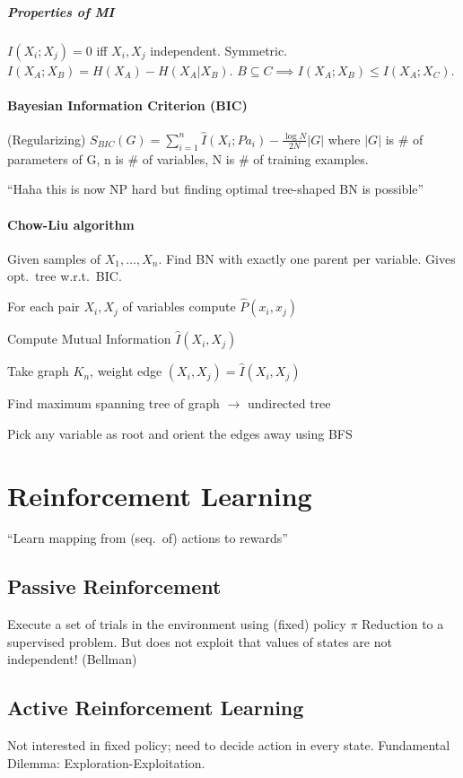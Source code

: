 \documentclass[a4paper, 10pt]{scrartcl}
\begin{document}
\begin{multicols*}{3}
\subparagraph{Properties of MI}
$I(X_i; X_j) = 0$ iff $X_i, X_j$ independent. Symmetric.
$I(X_A; X_B) = H(X_A) - H(X_A|X_B)$.
$B \subseteq C \implies I(X_A; X_B) \leq I(X_A; X_C)$. %

\paragraph{Bayesian Information Criterion (BIC)}
(Regularizing) $S_{BIC}(G) = \sum_{i=1}^{n} \hat{I}(X_i ; Pa_i) - \frac{\log N}{2N} |G|$ where $|G|$ is \# of parameters of G, n is \# of variables, N is \# of training examples.

``Haha this is now NP hard but finding optimal tree-shaped BN is possible''

\paragraph{Chow-Liu algorithm}
Given samples of $X_1,\dots,X_n$.
Find BN with exactly one parent per variable.
Gives opt.\ tree w.r.t.\ BIC.
\begin{compactitem}
	\item For each pair $X_i, X_j$ of variables compute $\hat{P}(x_i, x_j)$
	\item Compute Mutual Information $\hat{I}(X_i, X_j)$
	\item Take graph $K_n$, weight edge $(X_i,X_j) = \hat{I}(X_i, X_j)$
	\item Find maximum spanning tree of graph $\rightarrow$ undirected tree
	\item Pick any variable as root and orient the edges away using BFS
\end{compactitem}

\section{Reinforcement Learning}
``Learn mapping from (seq.\ of) actions to rewards''

\subsection{Passive Reinforcement}
Execute a set of trials in the environment using (fixed) policy  $\pi$
Reduction to a supervised problem. But does not exploit that values of states are not independent! (Bellman)

\subsection{Active Reinforcement Learning}
Not interested in fixed policy; need to decide action in every state. Fundamental Dilemma: Exploration-Exploitation.


\end{multicols*}
\end{document}

